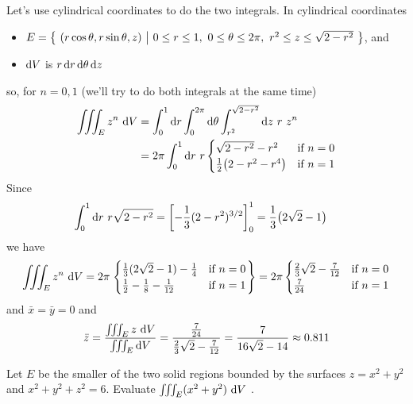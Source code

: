 \begin{solution}
Let's use cylindrical coordinates to do the two integrals.
In cylindrical coordinates 
\begin{itemize}
\item
$E = \Set{(r\cos\theta,r\sin\theta,z)}{ 0\le r\le 1,\ 0\le\theta\le 2\pi,\ 
                                     r^2\le z\le \sqrt{2-r^2}}$, and
\item
$\mathrm{d}V$ is $r\,\mathrm{d}r\,\mathrm{d}\theta\,\mathrm{d}z$
\end{itemize}
so, for $n=0,1$ (we'll try to do both integrals at the same time)
\begin{align*}
\iiint_E z^n\ \mathrm{d}V
&=\int_0^1\mathrm{d}r \int_0^{2\pi}\mathrm{d}\theta
   \int_{r^2}^{\sqrt{2-r^2}} \mathrm{d}z\ r\ z^n \\
&=2\pi\int_0^1\mathrm{d}r  \ r\begin{cases}
                  \sqrt{2-r^2}-r^2 & \text{if }n=0 \\
                  \frac{1}{2}\big(2-r^2-r^4\big) & \text{if }n=1
                  \end{cases}
\end{align*}
Since
\begin{align*}
\int_0^1 \mathrm{d}r\ r\sqrt{2-r^2}
&=\left[-\frac{1}{3}(2-r^2)^{3/2}\right]_0^1
=\frac{1}{3}\big(2\sqrt{2}-1\big)
\end{align*}
we have
\begin{align*}
\iiint_E z^n\ \mathrm{d}V
=2\pi\left.\begin{cases}
\frac{1}{3}(2\sqrt{2}-1)-\frac{1}{4} &\text{if }n=0 \\
\frac{1}{2}-\frac{1}{8}-\frac{1}{12} &\text{if }n=1 
\end{cases}\right\}
=2\pi\begin{cases}
\frac{2}{3}\sqrt{2}-\frac{7}{12} &\text{if }n=0 \\
\frac{7}{24} &\text{if }n=1 
\end{cases}
\end{align*}
and $\bar x=\bar y=0$ and
\begin{align*}
\bar z =\frac{\iiint_E z\ \mathrm{d}V}{\iiint_E\mathrm{d}V}
  =\frac{\frac{7}{24}}{\frac{2}{3}\sqrt{2}-\frac{7}{12}}
  =\frac{7}{16\sqrt{2}-14}
  \approx 0.811
\end{align*}
\end{solution}

\begin{question}[M200 2012A] %
Let $E$ be the smaller of the two solid regions bounded by the surfaces 
$z = x^2 + y^2$ and $x^2 + y^2 + z^2 = 6$. Evaluate
$\tripInt_E (x^2+y^2)\ \dee{V}$ .
\end{question}

